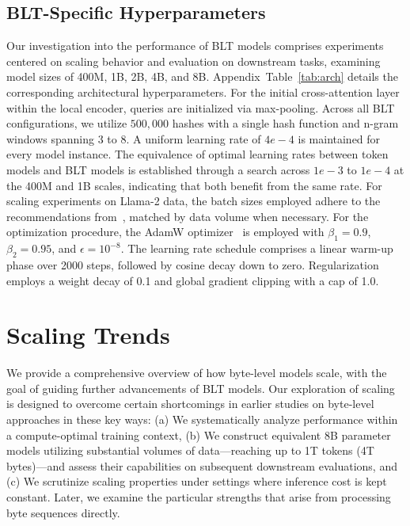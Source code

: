 \subsection{{\textsc BLT}-Specific Hyperparameters} 

Our investigation into the performance of {\textsc BLT} models comprises experiments centered on scaling behavior and evaluation on downstream tasks, examining model sizes of 400M, 1B, 2B, 4B, and 8B. Appendix~Table~\ref{tab:arch} details the corresponding architectural hyperparameters. For the initial cross-attention layer within the local encoder, queries are initialized via max-pooling. Across all {\textsc BLT} configurations, we utilize $500,000$ hashes with a single hash function and n-gram windows spanning 3 to 8. A uniform learning rate of $4e-4$ is maintained for every model instance. The equivalence of optimal learning rates between token models and {\textsc BLT} models is established through a search across $1e-3$ to $1e-4$ at the 400M and 1B scales, indicating that both benefit from the same rate. For scaling experiments on Llama-2 data, the batch sizes employed adhere to the recommendations from~\cite{dubey2024llama}, matched by data volume when necessary. For the optimization procedure, the AdamW optimizer~\citep{adamw} is employed with $\beta_1 = 0.9$, $\beta_2 = 0.95$, and $\epsilon = 10^{-8}$. The learning rate schedule comprises a linear warm-up phase over 2000 steps, followed by cosine decay down to zero. Regularization employs a weight decay of 0.1 and global gradient clipping with a cap of 1.0.

\section{Scaling Trends}
\label{section:scaling}

We provide a comprehensive overview of how byte-level models scale, with the goal of guiding further advancements of {\textsc BLT} models. Our exploration of scaling is designed to overcome certain shortcomings in earlier studies on byte-level approaches in these key ways: (a) We systematically analyze performance within a compute-optimal training context, (b) We construct equivalent 8B parameter models utilizing substantial volumes of data—reaching up to 1T tokens (4T bytes)—and assess their capabilities on subsequent downstream evaluations, and (c) We scrutinize scaling properties under settings where inference cost is kept constant. Later, we examine the particular strengths that arise from processing byte sequences directly.

